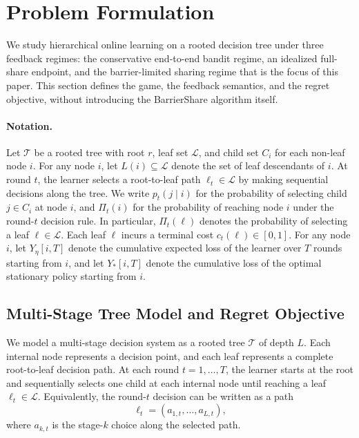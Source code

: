 
\section{Problem Formulation}

We study hierarchical online learning on a rooted decision tree under three feedback regimes: the conservative end-to-end bandit regime, an idealized full-share endpoint, and the barrier-limited sharing regime that is the focus of this paper. This section defines the game, the feedback semantics, and the regret objective, without introducing the BarrierShare algorithm itself.

\paragraph{Notation.}
Let $\mathcal{T}$ be a rooted tree with root $r$, leaf set $\mathcal{L}$, and child set $C_i$ for each non-leaf node $i$. For any node $i$, let $L(i) \subseteq \mathcal{L}$ denote the set of leaf descendants of $i$. At round $t$, the learner selects a root-to-leaf path $\ell_t \in \mathcal{L}$ by making sequential decisions along the tree. We write $p_t(j \mid i)$ for the probability of selecting child $j \in C_i$ at node $i$, and $\Pi_t(i)$ for the probability of reaching node $i$ under the round-$t$ decision rule. In particular, $\Pi_t(\ell)$ denotes the probability of selecting a leaf $\ell \in \mathcal{L}$. Each leaf $\ell$ incurs a terminal cost $c_t(\ell) \in [0,1]$. For any node $i$, let $Y_\eta[i,T]$ denote the cumulative expected loss of the learner over $T$ rounds starting from $i$, and let $Y_\ast[i,T]$ denote the cumulative loss of the optimal stationary policy starting from $i$.

\subsection{Multi-Stage Tree Model and Regret Objective}

We model a multi-stage decision system as a rooted tree $\mathcal{T}$ of depth $L$. Each internal node represents a decision point, and each leaf represents a complete root-to-leaf decision path. At each round $t = 1,\ldots,T$, the learner starts at the root and sequentially selects one child at each internal node until reaching a leaf $\ell_t \in \mathcal{L}$. Equivalently, the round-$t$ decision can be written as a path
\[
\ell_t = (a_{1,t}, \ldots, a_{L,t}),
\]
where $a_{k,t}$ is the stage-$k$ choice along the selected path.


